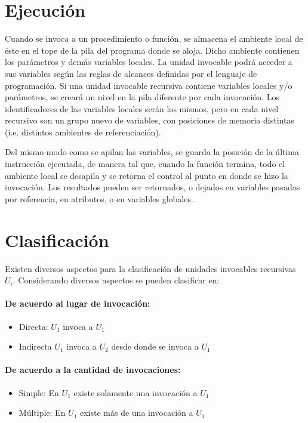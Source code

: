 \section{Ejecución}

Cuando se invoca a un procedimiento o función, se almacena el ambiente local de éste en el tope de la pila del programa donde se aloja. Dicho ambiente contienen los parámetros y demás variables locales. La unidad invocable podrá acceder a sus variables según las reglas de alcances definidas por el lenguaje de programación. Si una unidad invocable recursiva contiene variables locales y/o parámetros, se creará un nivel en la pila diferente por cada invocación. Los identificadores de las variables locales serán los mismos, pero en cada nivel recursivo son un grupo nuevo de variables, con posiciones de memoria distintas (i.e. distintos ambientes de referenciación).

Del mismo modo como se apilan las variables, se guarda la posición de la última instrucción ejecutada, de manera tal que, cuando la función termina, todo el ambiente local se desapila y se retorna el control al punto en donde se hizo la invocación. Los resultados pueden ser retornados, o dejados en variables pasadas por referencia, en atributos, o en variables globales.

\section{Clasificación}

Existen diversos aspectos para la clasificación de unidades invocables recursivas $U_i$. Considerando diversos aspectos se pueden clasificar en:


\paragraph{De acuerdo al lugar de invocación:}
\begin{itemize}
\item Directa: $U_1$ invoca a $U_1$
\item Indirecta $U_1$ invoca a $U_2$ desde donde se invoca a $U_1$
\end{itemize}

\paragraph{De acuerdo a la cantidad de invocaciones:}
\begin{itemize}
\item Simple: En $U_1$ existe solamente una invocación a $U_1$
\item Múltiple: En $U_1$ existe más de una invocación a $U_1$
\end{itemize}

